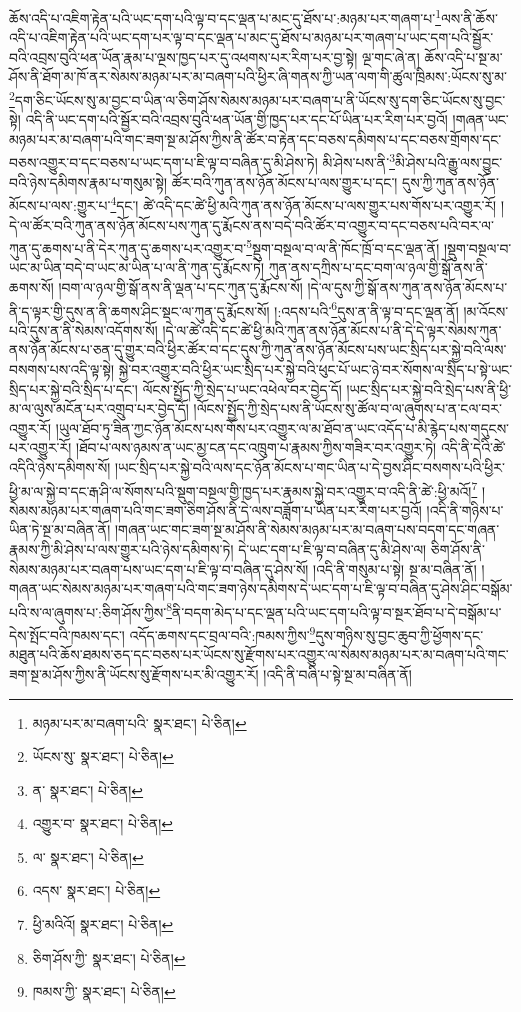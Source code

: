 ཆོས་འདི་པ་འཇིག་རྟེན་པའི་ཡང་དག་པའི་ལྟ་བ་དང་ལྡན་པ་མང་དུ་ཐོས་པ་:མཉམ་པར་གཞག་པ་\footnote{མཉམ་པར་མ་བཞག་པའི་  སྣར་ཐང་།  པེ་ཅིན། }ལས་ནི་ཆོས་འདི་པ་འཇིག་རྟེན་པའི་ཡང་དག་པར་ལྟ་བ་དང་ལྡན་པ་མང་དུ་ཐོས་པ་མཉམ་པར་གཞག་པ་ཡང་དག་པའི་སྦྱོར་བའི་འབྲས་བུའི་ཕན་ཡོན་རྣམ་པ་ལྔས་ཁྱད་པར་དུ་འཕགས་པར་རིག་པར་བྱ་སྟེ། ལྔ་གང་ཞེ་ན། ཆོས་འདི་པ་སྔ་མ་ཤོས་ནི་ཐོག་མ་ཁོ་ནར་སེམས་མཉམ་པར་མ་བཞག་པའི་ཕྱིར་ཞི་གནས་ཀྱི་ཡན་ལག་གི་ཚུལ་ཁྲིམས་:ཡོངས་སུ་མ་\footnote{ཡོངས་སུ་  སྣར་ཐང་།  པེ་ཅིན། }དག་ཅིང་ཡོངས་སུ་མ་བྱང་བ་ཡིན་ལ་ཅིག་ཤོས་སེམས་མཉམ་པར་བཞག་པ་ནི་ཡོངས་སུ་དག་ཅིང་ཡོངས་སུ་བྱང་སྟེ། འདི་ནི་ཡང་དག་པའི་སྦྱོར་བའི་འབྲས་བུའི་ཕན་ཡོན་གྱི་ཁྱད་པར་དང་པོ་ཡིན་པར་རིག་པར་བྱའོ། །གཞན་ཡང་མཉམ་པར་མ་བཞག་པའི་གང་ཟག་སྔ་མ་ཤོས་ཀྱིས་ནི་ཚོར་བ་རྟེན་དང་བཅས་དམིགས་པ་དང་བཅས་གྲོགས་དང་བཅས་འགྱུར་བ་དང་བཅས་པ་ཡང་དག་པ་ཇི་ལྟ་བ་བཞིན་དུ་མི་ཤེས་ཏེ། མི་ཤེས་པས་ནི་\footnote{ན་  སྣར་ཐང་།  པེ་ཅིན། }མི་ཤེས་པའི་རྒྱུ་ལས་བྱུང་བའི་ཉེས་དམིགས་རྣམ་པ་གསུམ་སྟེ། ཚོར་བའི་ཀུན་ནས་ཉོན་མོངས་པ་ལས་གྱུར་པ་དང་། དུས་ཀྱི་ཀུན་ནས་ཉོན་མོངས་པ་ལས་:གྱུར་པ་\footnote{འགྱུར་བ་  སྣར་ཐང་།  པེ་ཅིན། }དང་། ཚེ་འདི་དང་ཚེ་ཕྱི་མའི་ཀུན་ནས་ཉོན་མོངས་པ་ལས་གྱུར་པས་གོས་པར་འགྱུར་རོ། །དེ་ལ་ཚོར་བའི་ཀུན་ནས་ཉོན་མོངས་པས་ཀུན་དུ་རྨོངས་ནས་བདེ་བའི་ཚོར་བ་འགྱུར་བ་དང་བཅས་པའི་བར་ལ་ཀུན་དུ་ཆགས་པ་ནི་དེར་ཀུན་དུ་ཆགས་པར་འགྱུར་བ་\footnote{ལ་  སྣར་ཐང་།  པེ་ཅིན། }སྡུག་བསྔལ་བ་ལ་ནི་ཁོང་ཁྲོ་བ་དང་ལྡན་ནོ། །སྡུག་བསྔལ་བ་ཡང་མ་ཡིན་བདེ་བ་ཡང་མ་ཡིན་པ་ལ་ནི་ཀུན་དུ་རྨོངས་ཏེ། ཀུན་ནས་དཀྲིས་པ་དང་བག་ལ་ཉལ་གྱི་སྒོ་ནས་ནི་ཆགས་སོ། །བག་ལ་ཉལ་གྱི་སྒོ་ནས་ནི་ལྡན་པ་དང་ཀུན་དུ་རྨོངས་སོ། །དེ་ལ་དུས་ཀྱི་སྒོ་ནས་ཀུན་ནས་ཉོན་མོངས་པ་ནི་ད་ལྟར་གྱི་དུས་ན་ནི་ཆགས་ཤིང་སྡང་ལ་ཀུན་དུ་རྨོངས་སོ། །:འདས་པའི་\footnote{འདས་  སྣར་ཐང་།  པེ་ཅིན། }དུས་ན་ནི་ལྟ་བ་དང་ལྡན་ནོ། །མ་འོངས་པའི་དུས་ན་ནི་སེམས་འདོགས་སོ། །དེ་ལ་ཚེ་འདི་དང་ཚེ་ཕྱི་མའི་ཀུན་ནས་ཉོན་མོངས་པ་ནི་དེ་དེ་ལྟར་སེམས་ཀུན་ནས་ཉོན་མོངས་པ་ཅན་དུ་གྱུར་བའི་ཕྱིར་ཚོར་བ་དང་དུས་ཀྱི་ཀུན་ནས་ཉོན་མོངས་པས་ཡང་སྲིད་པར་སྐྱེ་བའི་ལས་བསགས་པས་འདི་ལྟ་སྟེ། སྐྱེ་བར་འགྱུར་བའི་ཕྱིར་ཡང་སྲིད་པར་སྐྱེ་བའི་ཕུང་པོ་ཡང་ཉེ་བར་སོགས་ལ་སྲིད་པ་སྟེ་ཡང་སྲིད་པར་སྐྱེ་བའི་སྲིད་པ་དང་། ལོངས་སྤྱོད་ཀྱི་སྲེད་པ་ཡང་འཕེལ་བར་བྱེད་དོ། །ཡང་སྲིད་པར་སྐྱེ་བའི་སྲེད་པས་ནི་ཕྱི་མ་ལ་ལུས་མངོན་པར་འགྲུབ་པར་བྱེད་དོ། །ལོངས་སྤྱོད་ཀྱི་སྲེད་པས་ནི་ཡོངས་སུ་ཚོལ་བ་ལ་ཞུགས་པ་ན་ངལ་བར་འགྱུར་རོ། །ཡུལ་ཐོབ་ཏུ་ཟིན་ཀྱང་ཉོན་མོངས་པས་གོས་པར་འགྱུར་ལ་མ་ཐོབ་ན་ཡང་འདོད་པ་མི་རྙེད་པས་གདུངས་པར་འགྱུར་རོ། །ཐོབ་པ་ལས་ཉམས་ན་ཡང་མྱ་ངན་དང་འཁྲུག་པ་རྣམས་ཀྱིས་གཟིར་བར་འགྱུར་ཏེ། འདི་ནི་དེའི་ཚེ་འདིའི་ཉེས་དམིགས་སོ། །ཡང་སྲིད་པར་སྐྱེ་བའི་ལས་དང་ཉོན་མོངས་པ་གང་ཡིན་པ་དེ་བྱས་ཤིང་བསགས་པའི་ཕྱིར་ཕྱི་མ་ལ་སྐྱེ་བ་དང་རྒ་ཤི་ལ་སོགས་པའི་སྡུག་བསྔལ་གྱི་ཁྱད་པར་རྣམས་སྐྱེ་བར་འགྱུར་བ་འདི་ནི་ཚེ་:ཕྱི་མའོ།\footnote{ཕྱི་མའིའོ།  སྣར་ཐང་།  པེ་ཅིན། } །སེམས་མཉམ་པར་གཞག་པའི་གང་ཟག་ཅིག་ཤོས་ནི་དེ་ལས་བཟློག་པ་ཡིན་པར་རིག་པར་བྱའོ། །འདི་ནི་གཉིས་པ་ཡིན་ཏེ་སྔ་མ་བཞིན་ནོ། །གཞན་ཡང་གང་ཟག་སྔ་མ་ཤོས་ནི་སེམས་མཉམ་པར་མ་བཞག་པས་བདག་དང་གཞན་རྣམས་ཀྱི་མི་ཤེས་པ་ལས་གྱུར་པའི་ཉེས་དམིགས་ཏེ། དེ་ཡང་དག་པ་ཇི་ལྟ་བ་བཞིན་དུ་མི་ཤེས་ལ། ཅིག་ཤོས་ནི་སེམས་མཉམ་པར་བཞག་པས་ཡང་དག་པ་ཇི་ལྟ་བ་བཞིན་དུ་ཤེས་སོ། །འདི་ནི་གསུམ་པ་སྟེ། སྔ་མ་བཞིན་ནོ། །གཞན་ཡང་སེམས་མཉམ་པར་གཞག་པའི་གང་ཟག་ཉེས་དམིགས་དེ་ཡང་དག་པ་ཇི་ལྟ་བ་བཞིན་དུ་ཤེས་ཤིང་བསྒོམ་པའི་ས་ལ་ཞུགས་པ་:ཅིག་ཤོས་ཀྱིས་\footnote{ཅིག་ཤོས་ཀྱི་  སྣར་ཐང་།  པེ་ཅིན། }ནི་བདག་མེད་པ་དང་ལྡན་པའི་ཡང་དག་པའི་ལྟ་བ་སྔར་ཐོབ་པ་དེ་བསྒོམ་པ་དེས་སྤོང་བའི་ཁམས་དང་། འདོད་ཆགས་དང་བྲལ་བའི་:ཁམས་ཀྱིས་\footnote{ཁམས་ཀྱི་  སྣར་ཐང་།  པེ་ཅིན། }དུས་གཉིས་སུ་བྱང་ཆུབ་ཀྱི་ཕྱོགས་དང་མཐུན་པའི་ཆོས་ཐམས་ཅད་དང་བཅས་པར་ཡོངས་སུ་རྫོགས་པར་འགྱུར་ལ་སེམས་མཉམ་པར་མ་བཞག་པའི་གང་ཟག་སྔ་མ་ཤོས་ཀྱིས་ནི་ཡོངས་སུ་རྫོགས་པར་མི་འགྱུར་རོ། །འདི་ནི་བཞི་པ་སྟེ་སྔ་མ་བཞིན་ནོ། 